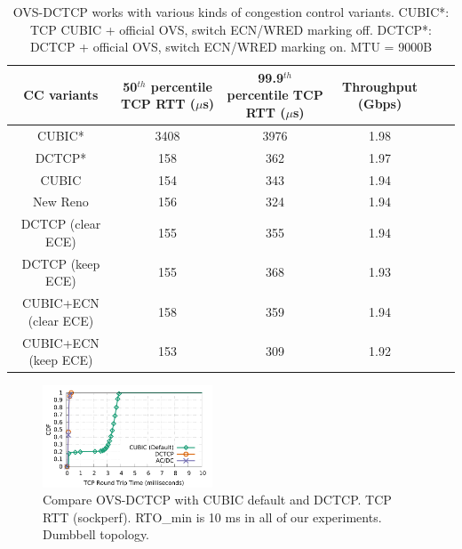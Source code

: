 \begin{table}[!htb]
\begin{center}
\begin{tabular}{ |c|c|c|c|c|c| }
 \hline
 CC variants & 50$^{th}$ percentile TCP RTT ($\mu$s) & 99.9$^{th}$ percentile TCP RTT ($\mu$s) & Throughput (Gbps) \\
 \hline
 CUBIC*  & 3408 & 3976 & 1.98 \\
 DCTCP*  & 158  & 362  & 1.97 \\ 
 \hline
 \hline 
 CUBIC & 154 & 343 & 1.94  \\
 New Reno   & 156 & 324 & 1.94 \\
 DCTCP (clear ECE) & 155 & 355 & 1.94 \\
 DCTCP (keep ECE) & 155 & 368  & 1.93 \\
 CUBIC+ECN (clear ECE) & 158 & 359 & 1.94\\
 CUBIC+ECN (keep ECE) &  153 & 309 & 1.92  \\
 \hline

\end{tabular}
\caption{OVS-DCTCP works with various kinds of congestion control variants.
        CUBIC*: TCP CUBIC + official OVS, switch ECN/WRED marking off.
        DCTCP*: DCTCP + official OVS, switch ECN/WRED marking on. MTU = 9000B} 
\label{other_cc_variants}
\end{center}
\end{table}


\begin{figure}[!htb]
        \centering
  \includegraphics[width=0.45\textwidth]{figures/convergence/flowcontrolOFF_sockperf/convergence_test_sockperf.pdf}
        \caption{Compare OVS-DCTCP with CUBIC default and DCTCP. TCP RTT (sockperf). RTO\_{min} is 10 ms in all of our experiments. Dumbbell topology.}
        \label{sockperf_convergence}
\end{figure}


